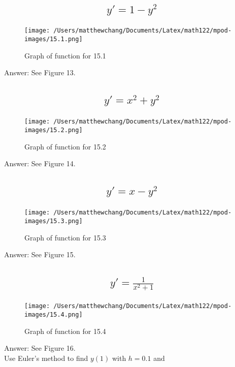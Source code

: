 \documentclass{article}
\begin{document}
\subsection{
	\begin{align*}
		y' = 1 - y^2
	\end{align*}
}
\begin{figure}
	\centering
	\texttt{[image: /Users/matthewchang/Documents/Latex/math122/mpod-images/15.1.png]}
	\caption{Graph of function for 15.1}
\end{figure}
Answer: See Figure 13.

\subsection{
	\begin{align*}
		y' = x^2 + y^2
	\end{align*}
}
\begin{figure}
	\centering
	\texttt{[image: /Users/matthewchang/Documents/Latex/math122/mpod-images/15.2.png]}
	\caption{Graph of function for 15.2}
\end{figure}
Answer: See Figure 14.

\subsection{
	\begin{align*}
		y' = x - y^2
	\end{align*}
}
\begin{figure}
	\centering
	\texttt{[image: /Users/matthewchang/Documents/Latex/math122/mpod-images/15.3.png]}
	\caption{Graph of function for 15.3}
\end{figure}
Answer: See Figure 15.

\subsection{
	\begin{align*}
		y' = \frac{1}{x^2 + 1}
	\end{align*}
}
\begin{figure}
	\centering
	\texttt{[image: /Users/matthewchang/Documents/Latex/math122/mpod-images/15.4.png]}
	\caption{Graph of function for 15.4}
\end{figure}
Answer: See Figure 16.
\\[10pt]
Use Euler's method to find $y(1)$ with $h = 0.1$ and 
\end{document}
